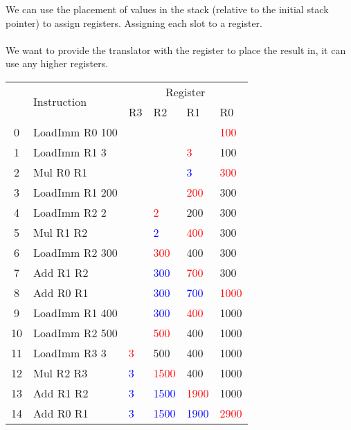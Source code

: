 \documentclass{report}
\newcommand{\hot}[1]{\textcolor{red}{#1}}
\newcommand{\old}[1]{\textcolor{blue}{#1}}
\begin{document}
We can use the placement of values in the stack (relative to the initial stack pointer) to assign registers. Assigning each slot to a register.
\\
\\ We want to provide the translator with the register to place the result in, it can use any higher registers.
\begin{center}
	\begin{tabular}{c l | l l l l}
		   & \multirow{2}{*}{Instruction} & \multicolumn{4}{c}{Register}                                        \\
		   &                              & R3                           & R2         & R1         & R0         \\
		\hline
		0  & LoadImm R0 100               &                              &            &            & \hot{100}  \\
		1  & LoadImm R1 3                 &                              &            & \hot{3}    & 100        \\
		2  & Mul R0 R1                    &                              &            & \old{3}    & \hot{300}  \\
		3  & LoadImm R1 200               &                              &            & \hot{200}  & 300        \\
		4  & LoadImm R2 2                 &                              & \hot{2}    & 200        & 300        \\
		5  & Mul R1 R2                    &                              & \old{2}    & \hot{400}  & 300        \\
		6  & LoadImm R2 300               &                              & \hot{300}  & 400        & 300        \\
		7  & Add R1 R2                    &                              & \old{300}  & \hot{700}  & 300        \\
		8  & Add R0 R1                    &                              & \old{300}  & \old{700}  & \hot{1000} \\
		9  & LoadImm R1 400               &                              & \old{300}  & \hot{400}  & 1000       \\
		10 & LoadImm R2 500               &                              & \hot{500}  & 400        & 1000       \\
		11 & LoadImm R3 3                 & \hot{3}                      & 500        & 400        & 1000       \\
		12 & Mul R2 R3                    & \old{3}                      & \hot{1500} & 400        & 1000       \\
		13 & Add R1 R2                    & \old{3}                      & \old{1500} & \hot{1900} & 1000       \\
		14 & Add R0 R1                    & \old{3}                      & \old{1500} & \old{1900} & \hot{2900} \\
	\end{tabular}
\end{center}
\end{document}

